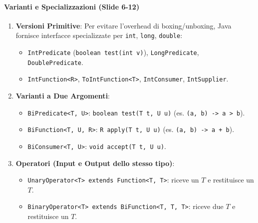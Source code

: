 \documentclass[11pt,a4paper]{article}
\newcommand{\passthrough}[1]{#1}
\providecommand{\tightlist}{\setlength{\itemsep}{0pt}\setlength{\parskip}{0pt}}
\begin{document}
\paragraph{Varianti e Specializzazioni (Slide
6-12)}\label{varianti-e-specializzazioni-slide-6-12}

\begin{enumerate}
\def\labelenumi{\arabic{enumi}.}
\tightlist
\item
  \textbf{Versioni Primitive}: Per evitare l'overhead di
  boxing/unboxing, Java fornisce interfacce specializzate per
  \passthrough{\lstinline!int!}, \passthrough{\lstinline!long!},
  \passthrough{\lstinline!double!}:

  \begin{itemize}
  \tightlist
  \item
    \passthrough{\lstinline!IntPredicate!}
    (\passthrough{\lstinline!boolean test(int v)!}),
    \passthrough{\lstinline!LongPredicate!},
    \passthrough{\lstinline!DoublePredicate!}.
  \item
    \passthrough{\lstinline!IntFunction<R>!},
    \passthrough{\lstinline!ToIntFunction<T>!},
    \passthrough{\lstinline!IntConsumer!},
    \passthrough{\lstinline!IntSupplier!}.
  \end{itemize}
\item
  \textbf{Varianti a Due Argomenti}:

  \begin{itemize}
  \tightlist
  \item
    \passthrough{\lstinline!BiPredicate<T, U>!}:
    \passthrough{\lstinline!boolean test(T t, U u)!} (es.
    \passthrough{\lstinline!(a, b) -> a > b!}).
  \item
    \passthrough{\lstinline!BiFunction<T, U, R>!}:
    \passthrough{\lstinline!R apply(T t, U u)!} (es.
    \passthrough{\lstinline!(a, b) -> a + b!}).
  \item
    \passthrough{\lstinline!BiConsumer<T, U>!}:
    \passthrough{\lstinline!void accept(T t, U u)!}.
  \end{itemize}
\item
  \textbf{Operatori (Input e Output dello stesso tipo)}:

  \begin{itemize}
  \tightlist
  \item
    \passthrough{\lstinline!UnaryOperator<T> extends Function<T, T>!}:
    riceve un \(T\) e restituisce un \(T\).
  \item
    \passthrough{\lstinline!BinaryOperator<T> extends BiFunction<T, T, T>!}:
    riceve due \(T\) e restituisce un \(T\).
  \end{itemize}
\end{enumerate}
\end{document}
